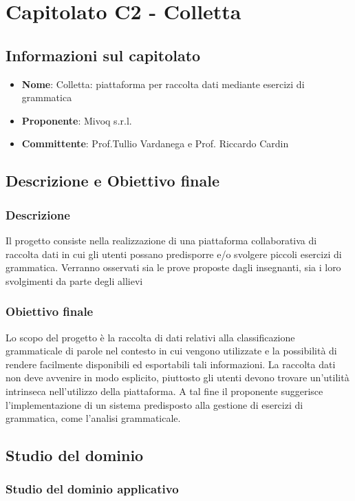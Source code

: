 \section{Capitolato C2 - Colletta}
\subsection{Informazioni sul capitolato}
\begin{itemize}
	\item \textbf{Nome}: Colletta: piattaforma per raccolta dati
	mediante esercizi di grammatica
	\item \textbf{Proponente}: Mivoq s.r.l.
	\item \textbf{Committente}: Prof.Tullio Vardanega e Prof. Riccardo Cardin
\end{itemize}
\subsection{Descrizione e Obiettivo finale}
\subsubsection{Descrizione}

Il progetto consiste nella realizzazione di una piattaforma collaborativa di raccolta dati in cui gli utenti possano predisporre e/o svolgere piccoli esercizi di grammatica. Verranno osservati sia le prove proposte dagli insegnanti, sia i loro svolgimenti da parte degli allievi
\subsubsection{Obiettivo finale}

Lo scopo del progetto è la raccolta di dati relativi alla classificazione grammaticale di parole nel contesto in cui vengono utilizzate e la possibilità di rendere facilmente disponibili ed esportabili tali informazioni. La raccolta dati non deve avvenire in modo esplicito, piuttosto gli utenti devono trovare un'utilità intrinseca nell'utilizzo della piattaforma. A tal fine il proponente suggerisce l'implementazione di un sistema predisposto alla gestione di esercizi di grammatica, come l'analisi grammaticale. 
\subsection{Studio del dominio}
\subsubsection{Studio del dominio applicativo}

